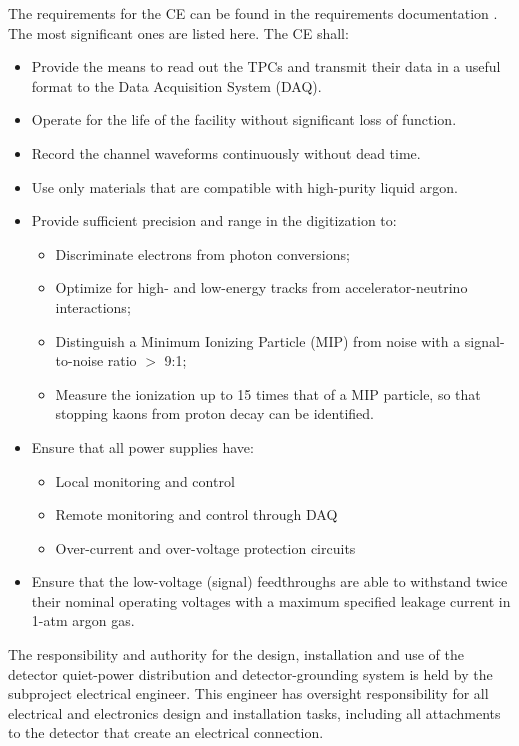 The requirements for the CE can be found in the requirements documentation \cite{lar-fd-req}.
The most significant ones are listed here. The CE shall:

\begin{itemize}	
\item Provide the means to read out the TPCs and transmit their data in a useful format to the Data Acquisition System (DAQ).
\item Operate for the life of the facility without significant loss of function.
\item Record the channel waveforms continuously without dead time.
\item Use only materials that are compatible with high-purity liquid argon.
\item Provide sufficient precision and range in the digitization to:
\begin{itemize}
\item Discriminate electrons from photon conversions;
\item Optimize for high- and low-energy tracks from accelerator-neutrino interactions;
\item Distinguish a Minimum Ionizing Particle (MIP) from noise with a signal-to-noise ratio $>$ 9:1;
\item Measure the ionization up to 15 times that of a MIP particle, so that stopping kaons from proton decay can be identified.
\end{itemize}
\item Ensure that all power supplies have: 
\begin{itemize}
\item Local monitoring and control
\item Remote monitoring and control through DAQ
\item Over-current and over-voltage protection circuits
\end{itemize}
\item Ensure that the low-voltage (signal) feedthroughs are able to withstand twice their nominal operating voltages 
with a maximum specified leakage current in 1-atm argon gas.
\end{itemize}

The responsibility and authority for the design, installation 
and use of the detector quiet-power distribution and 
detector-grounding system is held by the subproject electrical engineer. 
This engineer has oversight responsibility for all electrical and electronics 
design and installation tasks, including all attachments to the detector 
that create an electrical connection. 


